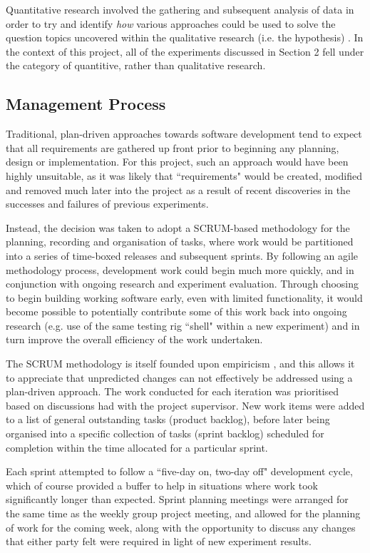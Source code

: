 Quantitative research involved the gathering and subsequent analysis of data in order to try and identify \textit{how} various approaches could be used to solve the question topics uncovered within the qualitative research (i.e. the hypothesis) \cite{research-types}. In the context of this project, all of the experiments discussed in Section 2 fell under the category of quantitive, rather than qualitative research.

\subsection{Management Process}
\label{mgmt}

Traditional, plan-driven approaches towards software development tend to expect that all requirements are gathered up front prior to beginning any planning, design or implementation. For this project, such an approach would have been highly unsuitable, as it was likely that ``requirements" would be created, modified and removed much later into the project as a result of recent discoveries in the successes and failures of previous experiments. 

Instead, the decision was taken to adopt a SCRUM-based methodology for the planning, recording and organisation of tasks, where work would be partitioned into a series of time-boxed releases and subsequent sprints. By following an agile methodology process, development work could begin much more quickly, and in conjunction with ongoing research and experiment evaluation. Through choosing to begin building working software early, even with limited functionality, it would become possible to potentially contribute some of this work back into ongoing research (e.g. use of the same testing rig ``shell" within a new experiment) and in turn improve the overall efficiency of the work undertaken.

The SCRUM methodology is itself founded upon empiricism \cite{}, and this allows it to appreciate that unpredicted changes can not effectively be addressed using a plan-driven approach. The work conducted for each iteration was prioritised based on discussions had with the project supervisor. New work items were added to a list of general outstanding tasks (product backlog), before later being organised into a specific collection of tasks (sprint backlog) scheduled for completion within the time allocated for a particular sprint.

Each sprint attempted to follow a ``five-day on, two-day off" development cycle, which of course provided a buffer to help in situations where work took significantly longer than expected. Sprint planning meetings were arranged for the same time as the weekly group project meeting, and allowed for the planning of work for the coming week, along with the opportunity to discuss any changes that either party felt were required in light of new experiment results.

